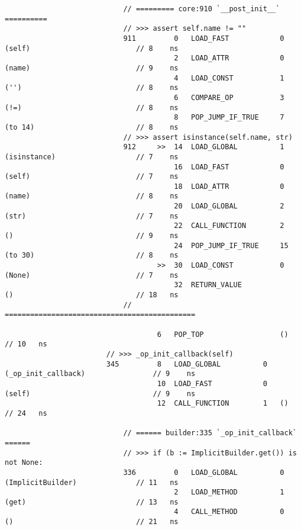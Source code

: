 \begin{code}
\begin{verbatim}
                            // ========= core:910 `__post_init__` ==========
                            // >>> assert self.name != ""
                            911         0   LOAD_FAST            0   (self)                         // 8    ns
                                        2   LOAD_ATTR            0   (name)                         // 9    ns
                                        4   LOAD_CONST           1   ('')                           // 8    ns
                                        6   COMPARE_OP           3   (!=)                           // 8    ns
                                        8   POP_JUMP_IF_TRUE     7   (to 14)                        // 8    ns
                            // >>> assert isinstance(self.name, str)
                            912     >>  14  LOAD_GLOBAL          1   (isinstance)                   // 7    ns
                                        16  LOAD_FAST            0   (self)                         // 7    ns
                                        18  LOAD_ATTR            0   (name)                         // 8    ns
                                        20  LOAD_GLOBAL          2   (str)                          // 7    ns
                                        22  CALL_FUNCTION        2   ()                             // 9    ns
                                        24  POP_JUMP_IF_TRUE     15  (to 30)                        // 8    ns
                                    >>  30  LOAD_CONST           0   (None)                         // 7    ns
                                        32  RETURN_VALUE             ()                             // 18   ns
                            // =============================================

                                    6   POP_TOP                  ()                                 // 10   ns
                        // >>> _op_init_callback(self)
                        345         8   LOAD_GLOBAL          0   (_op_init_callback)                // 9    ns
                                    10  LOAD_FAST            0   (self)                             // 9    ns
                                    12  CALL_FUNCTION        1   ()                                 // 24   ns

                            // ====== builder:335 `_op_init_callback` ======
                            // >>> if (b := ImplicitBuilder.get()) is not None:
                            336         0   LOAD_GLOBAL          0   (ImplicitBuilder)              // 11   ns
                                        2   LOAD_METHOD          1   (get)                          // 13   ns
                                        4   CALL_METHOD          0   ()                             // 21   ns


\end{verbatim}
\end{code}
